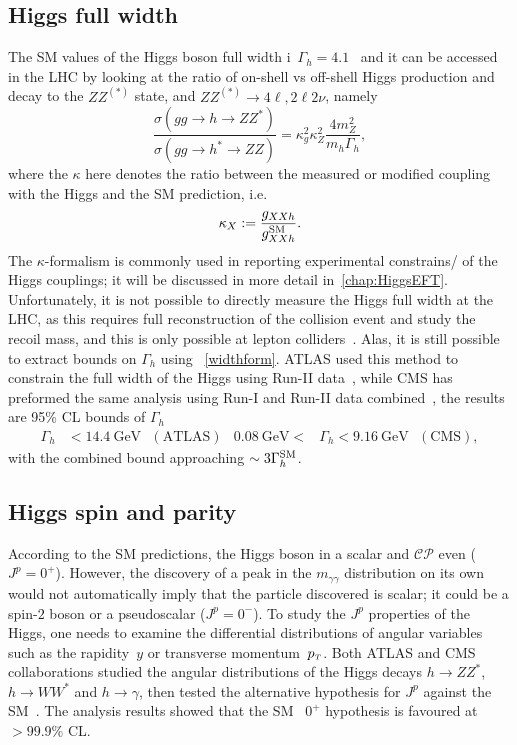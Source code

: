 \subsection{Higgs full width}
The SM values of the Higgs boson full width i~$\Gamma_h=4.1$ \GeV\, and it can be accessed in the LHC by looking at the ratio of on-shell vs off-shell Higgs production and decay to the $ZZ^{(*)}$ state, and $ZZ^{(*)}\to 4 \ell, 2 \ell 2 \nu$, namely
\begin{equation}
	\frac{\sigma(gg \to h\to Z Z^*)}{\sigma(gg \to h^*\to Z Z)} = \kappa_g^2 \kappa_Z^2 \frac{4 m_Z^2}{m_h \Gamma_h},
	\label{widthform}
\end{equation}
where the $\kappa$ here denotes the ratio between the measured or modified coupling with the Higgs and the SM prediction, i.e.
\begin{equation}
	\kappa_X := \frac{g_{XX h}}{g_{XXh}^{\mathrm{SM}}}.
	\label{kappa}
\end{equation}
The $\kappa$-formalism is commonly used in reporting experimental constrains/ of the Higgs couplings; it will be discussed in more detail in~\autoref{chap:HiggsEFT}. \\  Unfortunately, it is not possible to directly measure the Higgs full width at the LHC, as this requires full reconstruction of the collision event and study the recoil mass, and this is only possible at lepton colliders~\cite{DeBlas:2019qco,Banerjee:2021huv}. 
Alas, it is still possible to extract bounds on $\Gamma_h$ using ~\eqref{widthform}. ATLAS used this method to constrain the full width of the Higgs using Run-II data~\cite{ATLAS:2018jym}, while CMS has preformed the same analysis using Run-I and Run-II data combined~\cite{CMS:2019ekd}, the results are 95\% CL bounds of $\Gamma_h$
\begin{align}
	\Gamma_h &< \SI{14.4}{\giga\electronvolt} \,\,\,\, (\text{ATLAS}) & \SI{0.08}{\giga\electronvolt} <&\Gamma_h < \SI{9.16}{\giga\electronvolt}  \,\,\,\, (\text{CMS}),
\end{align}
with the combined bound approaching  $\sim 3 \Gamma_h^{\mathrm{SM}}$. 
\subsection{Higgs spin and parity \label{higgscp}}
According to the SM predictions, the Higgs boson in a scalar and $\mathcal{CP}$ even ($J^p= 0^+$). However, the discovery of a peak in the $m_{\gamma \gamma}$ distribution on its own would not automatically imply that the particle discovered is scalar; it could be a spin-$2$ boson or a pseudoscalar  ($J^p= 0^-$). To study the $J^p$ properties of the Higgs, one needs to examine the differential distributions of angular variables such as the rapidity~$y$ or transverse momentum~$p_{\scriptscriptstyle T}$. Both ATLAS and CMS collaborations studied the angular distributions of the Higgs decays $ h \to ZZ^*$, $h \to W W^*$ and $ h \to \gamma$, then tested the alternative hypothesis for $J^p$ against the SM~\cite{ATLAS:2015zhl, CMS:2014nkk}.  The analysis results showed that the SM ~$0^+$ hypothesis is favoured at $ >99.9\%$ CL. 
